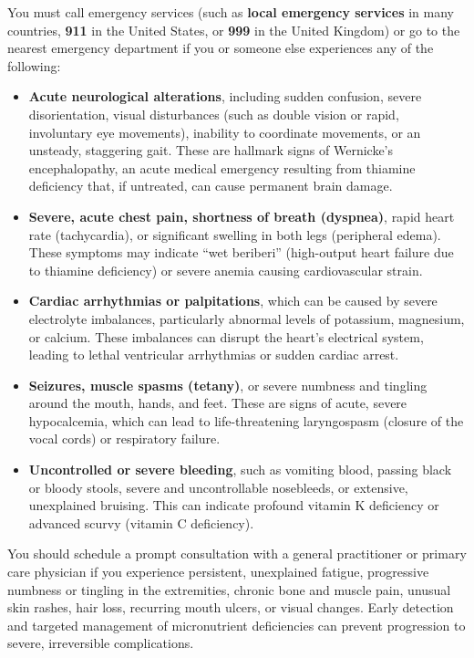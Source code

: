 You must call emergency services (such as \textbf{local emergency services} in many countries, \textbf{911} in the United States, or \textbf{999} in the United Kingdom) or go to the nearest emergency department if you or someone else experiences any of the following:
\begin{itemize}
\item \textbf{Acute neurological alterations}, including sudden confusion, severe disorientation, visual disturbances (such as double vision or rapid, involuntary eye movements), inability to coordinate movements, or an unsteady, staggering gait. These are hallmark signs of Wernicke's encephalopathy, an acute medical emergency resulting from thiamine deficiency that, if untreated, can cause permanent brain damage.
\item \textbf{Severe, acute chest pain, shortness of breath (dyspnea)}, rapid heart rate (tachycardia), or significant swelling in both legs (peripheral edema). These symptoms may indicate ``wet beriberi'' (high-output heart failure due to thiamine deficiency) or severe anemia causing cardiovascular strain.
\item \textbf{Cardiac arrhythmias or palpitations}, which can be caused by severe electrolyte imbalances, particularly abnormal levels of potassium, magnesium, or calcium. These imbalances can disrupt the heart's electrical system, leading to lethal ventricular arrhythmias or sudden cardiac arrest.
\item \textbf{Seizures, muscle spasms (tetany)}, or severe numbness and tingling around the mouth, hands, and feet. These are signs of acute, severe hypocalcemia, which can lead to life-threatening laryngospasm (closure of the vocal cords) or respiratory failure.
\item \textbf{Uncontrolled or severe bleeding}, such as vomiting blood, passing black or bloody stools, severe and uncontrollable nosebleeds, or extensive, unexplained bruising. This can indicate profound vitamin K deficiency or advanced scurvy (vitamin C deficiency).
\end{itemize}
You should schedule a prompt consultation with a general practitioner or primary care physician if you experience persistent, unexplained fatigue, progressive numbness or tingling in the extremities, chronic bone and muscle pain, unusual skin rashes, hair loss, recurring mouth ulcers, or visual changes. Early detection and targeted management of micronutrient deficiencies can prevent progression to severe, irreversible complications.

